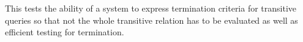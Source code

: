 


This tests the ability of a system to express termination criteria for transitive queries so that not the whole transitive relation has to be evaluated as well as efficient testing for termination.


